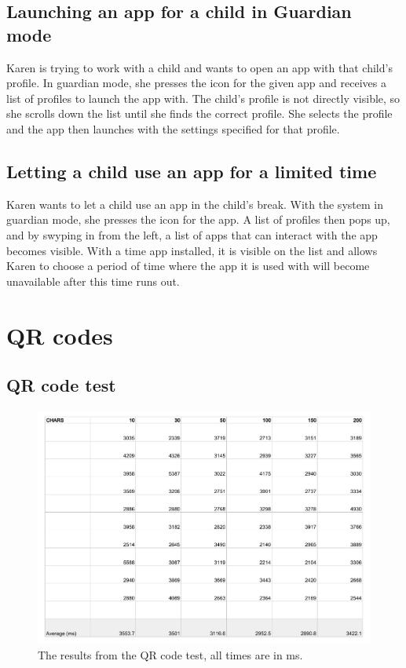 \section{Launching an app for a child in Guardian mode}
Karen is trying to work with a child and wants to open an app with that child's profile. 
In guardian mode, she presses the icon for the given app and receives a list of profiles to launch the app with. 
The child's profile is not directly visible, so she scrolls down the list until she finds the correct profile. 
She selects the profile and the app then launches with the settings specified for that profile.

\section{Letting a child use an app for a limited time}
Karen wants to let a child use an app in the child's break. 
With the system in guardian mode, she presses the icon for the app. 
A list of profiles then pops up, and by swyping in from the left, a list of apps that can interact with the app becomes visible. 
With a time app installed, it is visible on the list and allows Karen to choose a period of time where the app it is used with will become unavailable after this time runs out.

\chapter{QR codes}
\section{QR code test}
\begin{figure}[h!]
	\centering
	\includegraphics[scale=0.6]{gfx/QR-test.pdf}
	\caption{The results from the QR code test, all times are in ms.}
	\label{fig:QR-code-test}
\end{figure}

